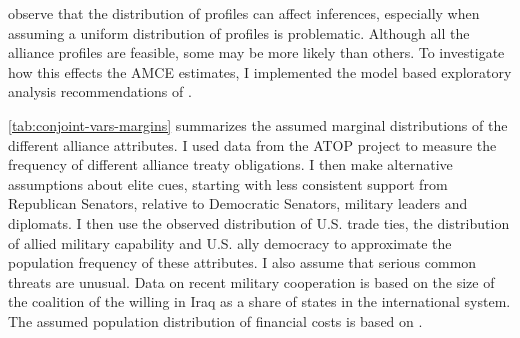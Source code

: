 \documentclass[12pt]{article}
\begin{document}
\citet{delaCuestaetal2021} observe that the distribution of profiles can affect inferences, especially when assuming a uniform distribution of profiles is problematic.
Although all the alliance profiles are feasible, some may be more likely than others. 
To investigate how this effects the AMCE estimates, I implemented the model based exploratory analysis recommendations of \citet{delaCuestaetal2021}. 


\autoref{tab:conjoint-vars-margins} summarizes the assumed marginal distributions of the different alliance attributes. 
I used data from the ATOP project \citep{Leedsetal2002} to measure the frequency of different alliance treaty obligations. 
I then make alternative assumptions about elite cues, starting with less consistent support from Republican Senators, relative to Democratic Senators, military leaders and diplomats. 
I then use the observed distribution of U.S. trade ties, the distribution of allied military capability and U.S. ally democracy to approximate the population frequency of these attributes. 
I also assume that serious common threats are unusual. 
Data on recent military cooperation is based on the size of the coalition of the willing in Iraq as a share of states in the international system. 
The assumed population distribution of financial costs is based on \citep{AlleyFuhrmann2021}. 
\end{document}
